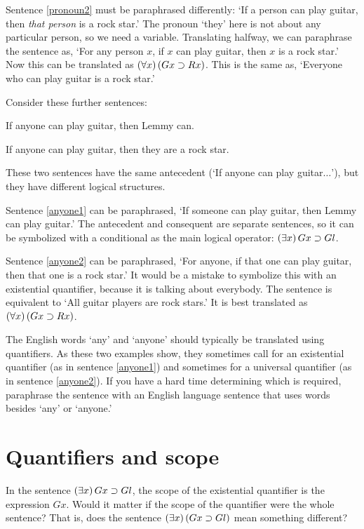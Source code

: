 Sentence \ref{pronoun2} must be paraphrased differently: `If a person can play guitar, then \emph{that person} is a rock star.' The pronoun `they' here is not about any particular person, so we need a variable. Translating halfway, we can paraphrase the sentence as, `For any person $x$, if $x$ can play guitar, then $x$ is a rock star.' Now this can be translated as $(\forall x) \, (Gx \supset Rx)$. This is the same as, `Everyone who can play guitar is a rock star.'


Consider these further sentences:

\begin{earg}
\item[\ex{anyone1}] If anyone can play guitar, then Lemmy can.
\item[\ex{anyone2}] If anyone can play guitar, then they are a rock star.
\end{earg}

These two sentences have the same antecedent (`If anyone can play guitar$\ldots$'), but they have different logical structures.

Sentence \ref{anyone1} can be paraphrased, `If someone can play guitar, then Lemmy can play guitar.' The antecedent and consequent are separate sentences, so it can be symbolized with a conditional as the main logical operator: $(\exists x) \, Gx \supset Gl$.

Sentence \ref{anyone2} can be paraphrased, `For anyone, if that one can play guitar, then that one is a rock star.' It would be a mistake to symbolize this with an existential quantifier, because it is talking about everybody. The sentence is equivalent to `All guitar players are rock stars.' It is best translated as $(\forall x) \,(Gx \supset Rx)$.

The English words `any' and `anyone' should typically be translated using quantifiers. As these two examples show, they sometimes call for an existential quantifier (as in sentence \ref{anyone1}) and sometimes for a universal quantifier (as in sentence \ref{anyone2}). If you have a hard time determining which is required, paraphrase the sentence with an English language sentence that uses words besides `any' or `anyone.'


\section{Quantifiers and scope}

In the sentence $(\exists x) \, Gx \supset Gl$, the scope of the existential quantifier is the expression $Gx$. Would it matter if the scope of the quantifier were the whole sentence? That is, does the sentence $(\exists x) \, (Gx \supset Gl)$ mean something different?

